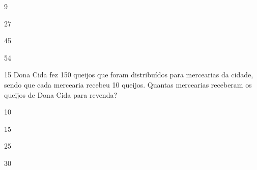 \begin{escolha}
\item 9

\item 27

\item 45

\item 54
\end{escolha}

\num{15} Dona Cida fez 150 queijos que foram distribuídos para mercearias da cidade, sendo que cada mercearia recebeu 10 queijos. Quantas mercearias receberam os queijos de Dona
Cida para revenda?

\begin{escolha}
\item 10

\item 15

\item 25

\item 30
\end{escolha}
